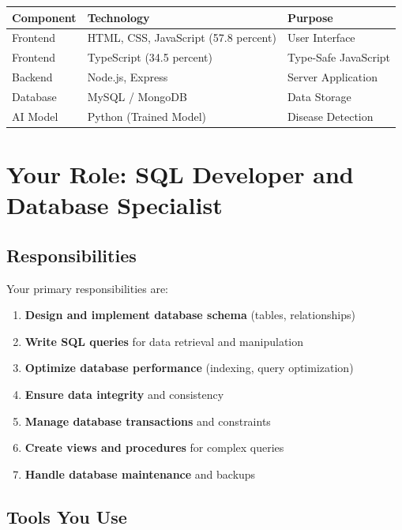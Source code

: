 \documentclass[12pt,a4paper]{article}
\begin{document}
\begin{table}[h]
\centering
\begin{tabular}{|l|l|l|}
\hline
\textbf{Component} & \textbf{Technology} & \textbf{Purpose} \\
\hline
Frontend & HTML, CSS, JavaScript (57.8 percent) & User Interface \\
Frontend & TypeScript (34.5 percent) & Type-Safe JavaScript \\
Backend & Node.js, Express & Server Application \\
Database & MySQL / MongoDB & Data Storage \\
AI Model & Python (Trained Model) & Disease Detection \\
\hline
\end{tabular}
\end{table}

\section{Your Role: SQL Developer and Database Specialist}

\subsection{Responsibilities}

Your primary responsibilities are:

\begin{enumerate}
    \item \textbf{Design and implement database schema} (tables, relationships)
    \item \textbf{Write SQL queries} for data retrieval and manipulation
    \item \textbf{Optimize database performance} (indexing, query optimization)
    \item \textbf{Ensure data integrity} and consistency
    \item \textbf{Manage database transactions} and constraints
    \item \textbf{Create views and procedures} for complex queries
    \item \textbf{Handle database maintenance} and backups
\end{enumerate}

\subsection{Tools You Use}
\end{document}
